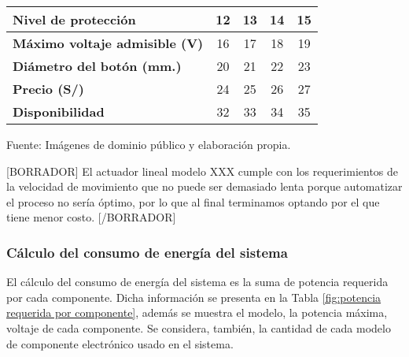 \begin{mytable}[H]
\begin{tabular}{l|c|c|c|c|}
	\multicolumn{1}{|l|}{\textbf{Nivel de protección}}      & 12                                                                    & 13         & 14         & 15         \\ \hline
	\multicolumn{1}{|l|}{
		\begin{minipage}{\myforthmaxsizeofcontenttable}			
			\textbf{Máximo voltaje admisible (V)}
		\end{minipage}
	}
	&
	16
	& 17         & 18         & 19         \\ \hline
	\multicolumn{1}{|l|}{
			\begin{minipage}{\myforthmaxsizeofcontenttable}			
				\textbf{Diámetro del botón (mm.)}
			\end{minipage}
	} & 20                                                                    & 21         & 22         & 23         \\ \hline
	\multicolumn{1}{|l|}{\textbf{Precio (S/)}}              & 24                                                                    & 25         & 26         & 27         \\ \hline
	\multicolumn{1}{|l|}{\textbf{Disponibilidad}}           & 32                                                                    & 33         & 34         & 35         \\ \hline
	\end{tabular}
	\begin{flushleft}	
		Fuente: Imágenes de dominio público y elaboración propia.
	\end{flushleft}
\end{mytable}

[BORRADOR] El actuador lineal modelo XXX cumple con los requerimientos de la velocidad de movimiento que no puede ser demasiado lenta porque automatizar el proceso no sería óptimo, por lo que al final terminamos optando por el que tiene menor costo. [/BORRADOR]

\subsubsection{Cálculo del consumo de energía del sistema} 

El cálculo del consumo de energía del sistema es la suma de potencia requerida por cada componente. Dicha información se presenta en la Tabla \ref{fig:potencia requerida por componente}, además se muestra el modelo, la potencia máxima, voltaje de cada componente. Se considera, también, la cantidad de cada modelo de componente electrónico usado en el sistema.

